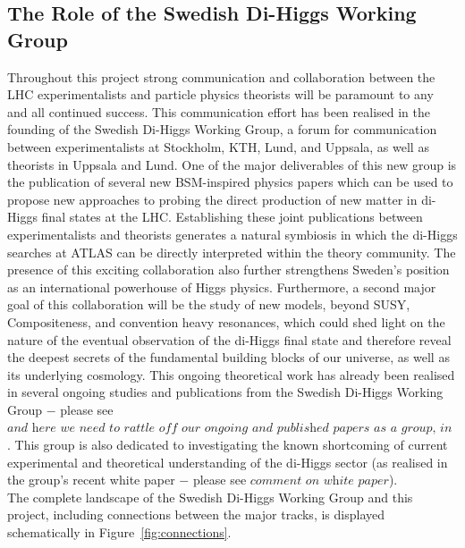 \documentclass[10pt,oneside,notitlepage,abstracton,a4paper]{scrartcl}
\begin{document}
\subsection{The Role of the Swedish Di-Higgs Working Group}

Throughout this project strong communication and collaboration between the LHC experimentalists and particle physics theorists will be paramount to any and all continued success. This communication effort has been realised in the founding of the Swedish Di-Higgs Working Group, a forum for communication between experimentalists at Stockholm, KTH, Lund, and Uppsala, as well as theorists in Uppsala and Lund. One of the major deliverables of this new group is the publication of several new BSM-inspired physics papers which can be used to propose new approaches to probing the direct production of new matter in di-Higgs final states at the LHC. Establishing these joint publications between experimentalists and theorists generates a natural symbiosis in which the di-Higgs searches at ATLAS can be directly interpreted within the theory community. The presence of this exciting collaboration also further strengthens Sweden's position as an international powerhouse of Higgs physics. Furthermore, a second major goal of this collaboration will be the study of new models, beyond SUSY, Compositeness, and convention heavy resonances, which could shed light on the nature of the eventual observation of the di-Higgs final state and therefore reveal the deepest secrets of the fundamental building blocks of our universe, as well as its underlying cosmology. This ongoing theoretical work has already been realised in several ongoing studies and publications from the Swedish Di-Higgs Working Group $-$ please see $\textit{and here we need to rattle off our ongoing and published papers as a group, in time for the grant submission}$. This group is also dedicated to investigating the known shortcoming of current experimental and theoretical understanding of the di-Higgs sector (as realised in the group's recent white paper $-$ please see $\textit{comment on white paper}$). \\

The complete landscape of the Swedish Di-Higgs Working Group and this project, including connections between the major tracks, is displayed schematically in Figure~\ref{fig:connections}. \\
\end{document}
